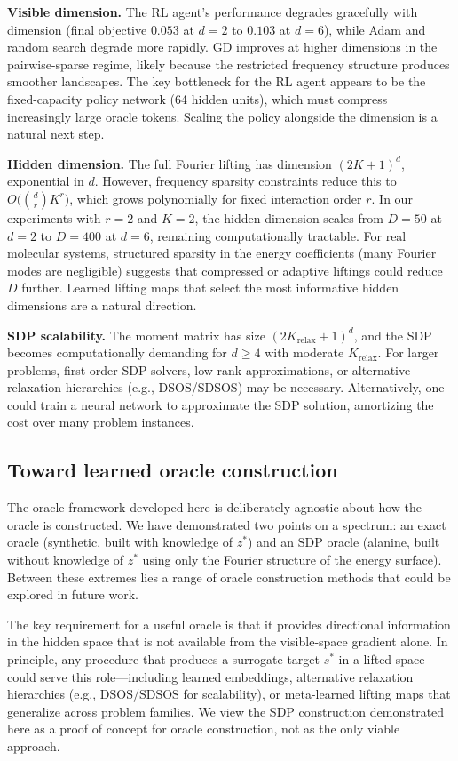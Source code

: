 \documentclass[10pt]{article}
\theoremstyle{definition}
\begin{document}
\textbf{Visible dimension.} The RL agent's performance degrades gracefully with dimension (final objective $0.053$ at $d = 2$ to $0.103$ at $d = 6$), while Adam and random search degrade more rapidly. GD improves at higher dimensions in the pairwise-sparse regime, likely because the restricted frequency structure produces smoother landscapes. The key bottleneck for the RL agent appears to be the fixed-capacity policy network (64 hidden units), which must compress increasingly large oracle tokens. Scaling the policy alongside the dimension is a natural next step.

\textbf{Hidden dimension.} The full Fourier lifting has dimension $(2K + 1)^d$, exponential in $d$. However, frequency sparsity constraints reduce this to $O\bigl(\binom{d}{r}K^r\bigr)$, which grows polynomially for fixed interaction order $r$. In our experiments with $r = 2$ and $K = 2$, the hidden dimension scales from $D = 50$ at $d = 2$ to $D = 400$ at $d = 6$, remaining computationally tractable. For real molecular systems, structured sparsity in the energy coefficients (many Fourier modes are negligible) suggests that compressed or adaptive liftings could reduce $D$ further. Learned lifting maps that select the most informative hidden dimensions are a natural direction.

\textbf{SDP scalability.} The moment matrix has size $(2K_{\mathrm{relax}} + 1)^d$, and the SDP becomes computationally demanding for $d \geq 4$ with moderate $K_{\mathrm{relax}}$. For larger problems, first-order SDP solvers, low-rank approximations, or alternative relaxation hierarchies (e.g., DSOS/SDSOS) may be necessary. Alternatively, one could train a neural network to approximate the SDP solution, amortizing the cost over many problem instances.

\subsection{Toward learned oracle construction}

The oracle framework developed here is deliberately agnostic about how the oracle is constructed. We have demonstrated two points on a spectrum: an exact oracle (synthetic, built with knowledge of $z^*$) and an SDP oracle (alanine, built without knowledge of $z^*$ using only the Fourier structure of the energy surface). Between these extremes lies a range of oracle construction methods that could be explored in future work.

The key requirement for a useful oracle is that it provides directional information in the hidden space that is not available from the visible-space gradient alone. In principle, any procedure that produces a surrogate target $s^*$ in a lifted space could serve this role---including learned embeddings, alternative relaxation hierarchies (e.g., DSOS/SDSOS for scalability), or meta-learned lifting maps that generalize across problem families. We view the SDP construction demonstrated here as a proof of concept for oracle construction, not as the only viable approach.
\end{document}
